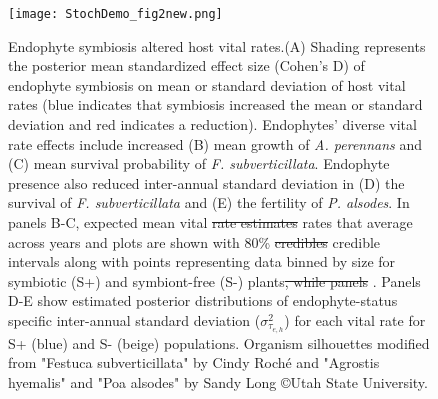 \documentclass[lineno, sn-basic]{sn-jnl}%
\providecommand{\DIFadd}[1]{{\protect\color{blue}#1}} %
\providecommand{\DIFdel}[1]{{\protect\color{red}\protect\scriptsize\sout{#1}}}
\providecommand{\DIFadd}[1]{{\protect\color{blue}\uwave{#1}}} %
\providecommand{\DIFdel}[1]{{\protect\color{red}\sout{#1}}}                      %
\providecommand{\DIFaddFL}[1]{\DIFadd{#1}} %
\providecommand{\DIFdelFL}[1]{\DIFdel{#1}} %
\providecommand{\DIFaddbeginFL}{} %
\providecommand{\DIFaddendFL}{} %
\providecommand{\DIFdelbeginFL}{} %
\providecommand{\DIFdelendFL}{} %
\newcommand{\DIFscaledelfig}{0.5}
\newlength{\DIFdelgraphicswidth} %
\newlength{\DIFdelgraphicsheight} %
\newcommand{\DIFaddincludegraphics}[2][]{{\color{blue}\fbox{\DIFOincludegraphics[#1]{#2}}}} %
\newcommand{\DIFdelincludegraphics}[2][]{%
\sbox{\DIFdelgraphicsbox}{\DIFOincludegraphics[#1]{#2}}%
\settoboxwidth{\DIFdelgraphicswidth}{\DIFdelgraphicsbox} %
\settoboxtotalheight{\DIFdelgraphicsheight}{\DIFdelgraphicsbox} %
\scalebox{\DIFscaledelfig}{%
\parbox[b]{\DIFdelgraphicswidth}{\usebox{\DIFdelgraphicsbox}\\[-\baselineskip] \rule{\DIFdelgraphicswidth}{0em}}\llap{\resizebox{\DIFdelgraphicswidth}{\DIFdelgraphicsheight}{%
\setlength{\unitlength}{\DIFdelgraphicswidth}%
\begin{picture}(1,1)%
\thicklines\linethickness{2pt} %
{\color[rgb]{1,0,0}\put(0,0){\framebox(1,1){}}}%
{\color[rgb]{1,0,0}\put(0,0){\line( 1,1){1}}}%
{\color[rgb]{1,0,0}\put(0,1){\line(1,-1){1}}}%
\end{picture}%
}\hspace*{3pt}}} %
} %
\DeclareRobustCommand{\DIFaddbeginFL}{\DIFOaddbeginFL \let\includegraphics\DIFaddincludegraphics} %
\DeclareRobustCommand{\DIFaddendFL}{\DIFOaddendFL \let\includegraphics\DIFOincludegraphics} %
\DeclareRobustCommand{\DIFdelbeginFL}{\DIFOdelbeginFL \let\includegraphics\DIFdelincludegraphics} %
\DeclareRobustCommand{\DIFdelendFL}{\DIFOaddendFL \let\includegraphics\DIFOincludegraphics} %
\begin{document}
\begin{figure}[h]
	\centering
	\DIFdelbeginFL %
\DIFdelendFL \DIFaddbeginFL \texttt{[image: StochDemo\_fig2new.png]}
	\caption[Endophyte symbiosis altered host vital rates]{\DIFaddendFL Endophyte symbiosis altered host vital rates.(A) Shading represents the posterior mean standardized effect size (Cohen's D) of endophyte symbiosis on mean or standard deviation of host vital rates (blue indicates that symbiosis increased the mean or standard deviation and red indicates a reduction). Endophytes' diverse vital rate effects include increased (B) mean growth of \emph{A. perennans} and (C) mean survival probability of \emph{F. subverticillata}. Endophyte presence also reduced inter-annual standard deviation in (D) the survival of \emph{F. subverticillata} and (E) the fertility of \emph{P. alsodes}. In panels B-C, \DIFaddbeginFL \DIFaddFL{expected }\DIFaddendFL mean vital \DIFdelbeginFL \DIFdelFL{rate estimates }\DIFdelendFL \DIFaddbeginFL \DIFaddFL{rates that average across years and plots }\DIFaddendFL are shown with 80\% \DIFdelbeginFL \DIFdelFL{credibles }\DIFdelendFL \DIFaddbeginFL \DIFaddFL{credible intervals }\DIFaddendFL along with \DIFaddbeginFL \DIFaddFL{points representing }\DIFaddendFL data binned by size for symbiotic (S+) and symbiont-free (S-) plants\DIFdelbeginFL \DIFdelFL{, while panels }\DIFdelendFL \DIFaddbeginFL \DIFaddFL{. Panels }\DIFaddendFL D-E show estimated posterior distributions of endophyte-status specific inter-annual standard deviation ($\sigma^2_{\tau_{e,h}}$)  for each vital rate for S+ (blue) and S- (beige) populations. Organism silhouettes modified from "Festuca subverticillata" by Cindy Roch\'e and "Agrostis hyemalis" and "Poa alsodes" by Sandy Long \copyright Utah State University.}
\end{figure}
\end{document}
